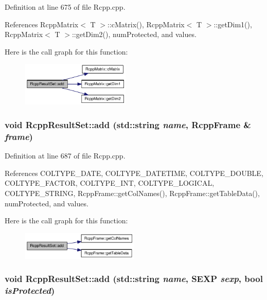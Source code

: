 Definition at line 675 of file Rcpp.cpp.

References RcppMatrix$<$ T $>$::cMatrix(), RcppMatrix$<$ T $>$::getDim1(), RcppMatrix$<$ T $>$::getDim2(), numProtected, and values.

Here is the call graph for this function:\nopagebreak
\begin{figure}[H]
\begin{center}
\leavevmode
\includegraphics[width=146pt]{classRcppResultSet_f6f50ca0a589fc12ef68c0406e83243b_cgraph}
\end{center}
\end{figure}
\hypertarget{classRcppResultSet_9e05fb2ca92258529ffbb536e23a2a4d}{
\subsubsection[add]{\setlength{\rightskip}{0pt plus 5cm}void RcppResultSet::add (std::string {\em name}, \/  {\bf RcppFrame} \& {\em frame})}}
\label{classRcppResultSet_9e05fb2ca92258529ffbb536e23a2a4d}




Definition at line 687 of file Rcpp.cpp.

References COLTYPE\_\-DATE, COLTYPE\_\-DATETIME, COLTYPE\_\-DOUBLE, COLTYPE\_\-FACTOR, COLTYPE\_\-INT, COLTYPE\_\-LOGICAL, COLTYPE\_\-STRING, RcppFrame::getColNames(), RcppFrame::getTableData(), numProtected, and values.

Here is the call graph for this function:\nopagebreak
\begin{figure}[H]
\begin{center}
\leavevmode
\includegraphics[width=158pt]{classRcppResultSet_9e05fb2ca92258529ffbb536e23a2a4d_cgraph}
\end{center}
\end{figure}
\hypertarget{classRcppResultSet_5f44a63a2cab43db551c0e27d6fec378}{
\subsubsection[add]{\setlength{\rightskip}{0pt plus 5cm}void RcppResultSet::add (std::string {\em name}, \/  SEXP {\em sexp}, \/  bool {\em isProtected})}}
\label{classRcppResultSet_5f44a63a2cab43db551c0e27d6fec378}




